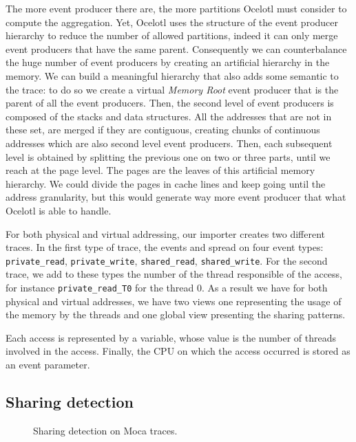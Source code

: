 The more event producer there are, the more partitions \gls{Ocelotl} must consider to compute the aggregation.
Yet, \gls{Ocelotl} uses the structure of the event producer hierarchy to reduce the number of allowed partitions, indeed it can only merge event producers that have the same parent.
Consequently we can counterbalance the huge number of event producers by creating an artificial hierarchy in the memory.
We can build a meaningful hierarchy that also adds some semantic to the trace: to do so we create a virtual \emph{Memory Root} event producer that is the parent of all the event producers.
Then, the second level of event producers is composed of the stacks and data structures.
All the addresses that are not in these set, are merged if they are contiguous, creating chunks of continuous addresses which are also second level event producers.
Then, each subsequent level is obtained by splitting the previous one on two or three parts, until we reach at the page level.
The pages are the leaves of this artificial memory hierarchy.
We could divide the pages in cache lines and keep going until the address granularity, but this would generate way more event producer that what \gls{Ocelotl} is able to handle.

For both physical and virtual addressing, our importer creates two different traces.
In the first type of trace, the events and spread on four event types: \texttt{private\_read}, \texttt{private\_write}, \texttt{shared\_read}, \texttt{shared\_write}.
For the second trace, we add to these types the number of the thread responsible of the access, for instance \texttt{private\_read\_T0} for the thread $0$.
As a result we have for both physical and virtual addresses, we have two views one representing the usage of the memory by the threads and one global view presenting the sharing patterns.

Each access is represented by a variable, whose value is the number of threads involved in the access.
Finally, the \gls{CPU} on which the access occurred is stored as an event parameter.

\subsection{Sharing detection}

\begin{figure}[htb]
    \centering
    
    \caption{Sharing detection on Moca traces.}
    \label{fig:sharing-detection}
\end{figure}

